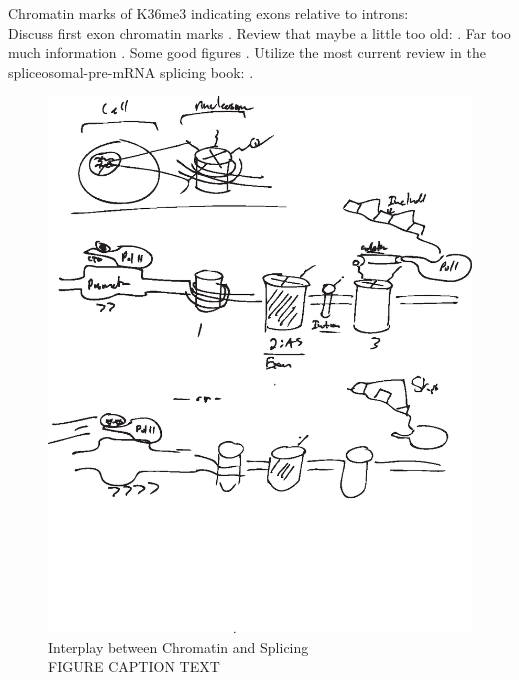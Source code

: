 
    Chromatin marks of K36me3 indicating exons relative to introns: \citep{Kolasinska-Zwierz2009}\\
    Discuss first exon chromatin marks \citep{Bieberstein2012}.
    Review that maybe a little too old: \citep{Schwartz2010}.
    Far too much information \citep{Luco2011a}.
    Some good figures \citep{Brown2012}.
    Utilize the most current review in the spliceosomal-pre-mRNA splicing book: \citep{Haque2014}.

    \begin{figure}[!h] %
      \centering 
      \includegraphics{Figures/Intro/Chromatin_and_Splicing.eps}
      \caption[Interplay between Chromatin and Splicing]
      {Interplay between Chromatin and Splicing \\[0.25cm]
        FIGURE CAPTION TEXT
        }
      \label{Intro:figIntro:Chromatin and Splicing}
      \end{figure}

